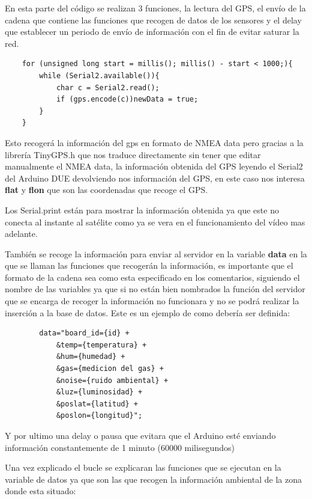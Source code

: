 En esta parte del código se realizan 3 funciones, la lectura del GPS, el envío de la cadena que contiene las funciones que recogen de datos de los sensores y el delay que establecer un periodo de envío de información con el fin de evitar saturar la red.\\

\begin{lstlisting}
	for (unsigned long start = millis(); millis() - start < 1000;){
		while (Serial2.available()){
			char c = Serial2.read();
			if (gps.encode(c))newData = true;
		}
	}
\end{lstlisting}

Esto recogerá la información del gps en formato de NMEA data pero gracias a la librería TinyGPS.h que nos traduce directamente sin tener que editar manualmente el NMEA data, la información obtenida del GPS leyendo el Serial2 del Arduino DUE devolviendo nos información del GPS, en este caso nos interesa \textbf{flat} y \textbf{flon} que son las coordenadas que recoge el GPS.

 Los Serial.print están para mostrar la información obtenida ya que este no conecta al instante al satélite como ya se vera en el funcionamiento del vídeo mas adelante.

También se recoge la información para enviar al servidor en la variable \textbf{data} en la que se llaman las funciones que recogerán la información, es importante que el formato de la cadena sea como esta especificado en los comentarios, siguiendo el nombre de las variables ya que si no están bien nombrados la función del servidor que se encarga de recoger la información no funcionara y no se podrá realizar la inserción a la base de datos. Este es un ejemplo de como debería ser definida:\\

\begin{lstlisting}
		data="board_id={id} +
			&temp={temperatura} +
			&hum={humedad} +
			&gas={medicion del gas} +
			&noise={ruido ambiental} +
			&luz={luminosidad} +
			&poslat={latitud} +
			&poslon={longitud}";
\end{lstlisting}

Y por ultimo una delay o pausa que evitara que el Arduino esté enviando información constantemente de 1 minuto (60000 milisegundos)

Una vez explicado el bucle se explicaran las funciones que se ejecutan en la variable de datos ya que son las que recogen la información ambiental de la zona donde esta situado:\\

